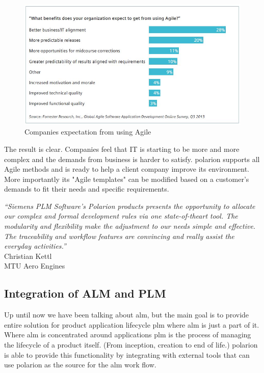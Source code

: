 \documentclass[thesis=M,english]{FITthesis}[2012/06/26]
\begin{document}
\begin{figure}[h!]\centering
	\includegraphics[width=1\textwidth]{pictures/agile_benefits}
	\caption{Companies expectation from using Agile\cite{polarion_alm}}\label{fig:agile_benefits}
\end{figure}

The result is clear. Companies feel that IT is starting to be more and more complex and the demands from business is harder to satisfy. \acrshort{polarion} supports all Agile methods and is ready to help a client company improve its environment. More importantly its "Agile templates" can be modified based on a customer's demands to fit their needs and specific requirements.

\begin{center}
	\textit{“Siemens PLM Software’s Polarion
		products presents the opportunity to
		allocate our complex and formal
		development rules via one state-of-theart
		tool. The modularity and flexibility
		make the adjustment to our needs simple
		and effective. The traceability and
		workflow features are convincing and
		really assist the everyday activities.”}\\
Christian Kettl\\
MTU Aero Engines\\
\end{center}

\subsection{Integration of ALM and PLM}

Up until now we have been talking about \acrshort{alm}, but the main goal is to provide entire solution for product application lifecycle \acrshort{plm} where \acrshort{alm} is just a part of it. Where \acrshort{alm} is concentrated around applications \acrshort{plm} is the process of managing the lifecycle of a product itself. (From inception, creation to end of life.) \acrshort{polarion} is able to provide this functionality by integrating with external tools that can use \acrshort{polarion} as the source for the \acrshort{alm} work flow.\\
\end{document}
